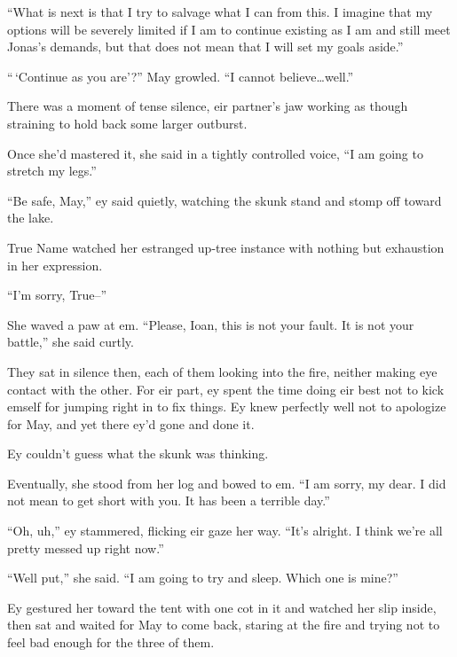 ``What is next is that I try to salvage what I can from this. I imagine that my options will be severely limited if I am to continue existing as I am and still meet Jonas's demands, but that does not mean that I will set my goals aside.''

``\,`Continue as you are'?'' May growled. ``I cannot believe\ldots well.''

There was a moment of tense silence, eir partner's jaw working as though straining to hold back some larger outburst.

Once she'd mastered it, she said in a tightly controlled voice, ``I am going to stretch my legs.''

``Be safe, May,'' ey said quietly, watching the skunk stand and stomp off toward the lake.

True Name watched her estranged up-tree instance with nothing but exhaustion in her expression.

``I'm sorry, True--''

She waved a paw at em. ``Please, Ioan, this is not your fault. It is not your battle,'' she said curtly.

They sat in silence then, each of them looking into the fire, neither making eye contact with the other. For eir part, ey spent the time doing eir best not to kick emself for jumping right in to fix things. Ey knew perfectly well not to apologize for May, and yet there ey'd gone and done it.

Ey couldn't guess what the skunk was thinking.

Eventually, she stood from her log and bowed to em. ``I am sorry, my dear. I did not mean to get short with you. It has been a terrible day.''

``Oh, uh,'' ey stammered, flicking eir gaze her way. ``It's alright. I think we're all pretty messed up right now.''

``Well put,'' she said. ``I am going to try and sleep. Which one is mine?''

Ey gestured her toward the tent with one cot in it and watched her slip inside, then sat and waited for May to come back, staring at the fire and trying not to feel bad enough for the three of them.
